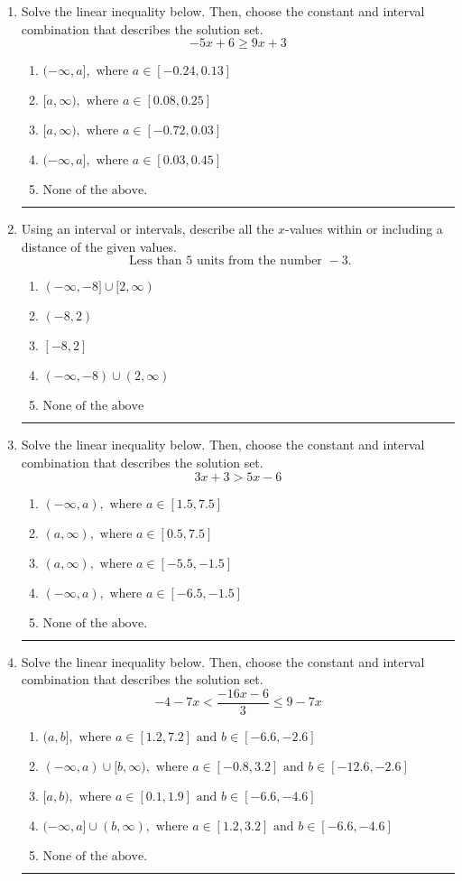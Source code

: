 \documentclass[14pt]{extbook}
\newcommand{\litem}[1]{\item#1\hspace*{-1cm}\rule{\textwidth}{0.4pt}}
\begin{document}
\begin{enumerate}
{\begin{enumerate}[label=\Alph*.]
\end{enumerate} }
\litem{
Solve the linear inequality below. Then, choose the constant and interval combination that describes the solution set.\[ -5x + 6 \geq 9x + 3 \]\begin{enumerate}[label=\Alph*.]
\item \( (-\infty, a], \text{ where } a \in [-0.24, 0.13] \)
\item \( [a, \infty), \text{ where } a \in [0.08, 0.25] \)
\item \( [a, \infty), \text{ where } a \in [-0.72, 0.03] \)
\item \( (-\infty, a], \text{ where } a \in [0.03, 0.45] \)
\item \( \text{None of the above}. \)

\end{enumerate} }
\litem{
Using an interval or intervals, describe all the $x$-values within or including a distance of the given values.\[ \text{ Less than } 5 \text{ units from the number } -3. \]\begin{enumerate}[label=\Alph*.]
\item \( (-\infty, -8] \cup [2, \infty) \)
\item \( (-8, 2) \)
\item \( [-8, 2] \)
\item \( (-\infty, -8) \cup (2, \infty) \)
\item \( \text{None of the above} \)

\end{enumerate} }
\litem{
Solve the linear inequality below. Then, choose the constant and interval combination that describes the solution set.\[ 3x + 3 > 5x -6 \]\begin{enumerate}[label=\Alph*.]
\item \( (-\infty, a), \text{ where } a \in [1.5, 7.5] \)
\item \( (a, \infty), \text{ where } a \in [0.5, 7.5] \)
\item \( (a, \infty), \text{ where } a \in [-5.5, -1.5] \)
\item \( (-\infty, a), \text{ where } a \in [-6.5, -1.5] \)
\item \( \text{None of the above}. \)

\end{enumerate} }
\litem{
Solve the linear inequality below. Then, choose the constant and interval combination that describes the solution set.\[ -4 - 7 x < \frac{-16 x - 6}{3} \leq 9 - 7 x \]\begin{enumerate}[label=\Alph*.]
\item \( (a, b], \text{ where } a \in [1.2, 7.2] \text{ and } b \in [-6.6, -2.6] \)
\item \( (-\infty, a) \cup [b, \infty), \text{ where } a \in [-0.8, 3.2] \text{ and } b \in [-12.6, -2.6] \)
\item \( [a, b), \text{ where } a \in [0.1, 1.9] \text{ and } b \in [-6.6, -4.6] \)
\item \( (-\infty, a] \cup (b, \infty), \text{ where } a \in [1.2, 3.2] \text{ and } b \in [-6.6, -4.6] \)
\item \( \text{None of the above.} \)


\end{enumerate}}
\end{enumerate}
\end{document}
